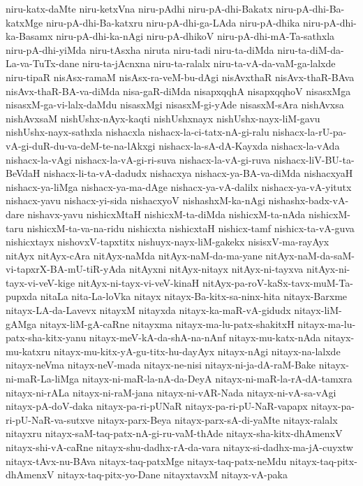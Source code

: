 {niru-katx-daMte
niru-ketxVna
niru-pAdhi
niru-pA-dhi-Bakatx
niru-pA-dhi-Ba-katxMge
niru-pA-dhi-Ba-katxru
niru-pA-dhi-ga-LAda
niru-pA-dhika
niru-pA-dhi-ka-Basamx
niru-pA-dhi-ka-nAgi
niru-pA-dhikoV
niru-pA-dhi-mA-Ta-sathxla
niru-pA-dhi-yiMda
niru-tAsxha
niruta
niru-tadi
niru-ta-diMda
niru-ta-diM-da-La-va-TuTx-dane
niru-ta-jAcnxna
niru-ta-ralalx
niru-ta-vA-da-vaM-ga-lalxde
niru-tipaR
nisAsx-ramaM
nisAsx-ra-veM-bu-dAgi
nisAvxthaR
nisAvx-thaR-BAva
nisAvx-thaR-BA-va-diMda
nisa-gaR-diMda
nisapxqqhA
nisapxqqhoV
nisasxMga
nisasxM-ga-vi-lalx-daMdu
nisasxMgi
nisasxM-gi-yAde
nisasxM-sAra
nishAvxsa
nishAvxsaM
nishUshx-nAyx-kaqti
nishUshxnayx
nishUshx-nayx-liM-gavu
nishUshx-nayx-sathxla
nishacxla
nishacx-la-ci-tatx-nA-gi-ralu
nishacx-la-rU-pa-vA-gi-duR-du-va-deM-te-na-lAkxgi
nishacx-la-sA-dA-Kayxda
nishacx-la-vAda
nishacx-la-vAgi
nishacx-la-vA-gi-ri-suva
nishacx-la-vA-gi-ruva
nishacx-liV-BU-ta-BeVdaH
nishacx-li-ta-vA-dadudx
nishacxya
nishacx-ya-BA-va-diMda
nishacxyaH
nishacx-ya-liMga
nishacx-ya-ma-dAge
nishacx-ya-vA-dalilx
nishacx-ya-vA-yitutx
nishacx-yavu
nishacx-yi-sida
nishacxyoV
nishashxM-ka-nAgi
nishashx-badx-vA-dare
nishavx-yavu
nishicxMtaH
nishicxM-ta-diMda
nishicxM-ta-nAda
nishicxM-taru
nishicxM-ta-va-na-ridu
nishicxta
nishicxtaH
nishicx-tamf
nishicx-ta-vA-guva
nishicxtayx
nishovxV-tapxtitx
nishuyx-nayx-liM-gakekx
nisisxV-ma-rayAyx
nitAyx
nitAyx-cAra
nitAyx-naMda
nitAyx-naM-da-ma-yane
nitAyx-naM-da-saM-vi-tapxrX-BA-mU-tiR-yAda
nitAyxni
nitAyx-nitayx
nitAyx-ni-tayxva
nitAyx-ni-tayx-vi-veV-kige
nitAyx-ni-tayx-vi-veV-kinaH
nitAyx-pa-roV-kaSx-tavx-muM-Ta-pupxda
nitaLa
nita-La-loVka
nitayx
nitayx-Ba-kitx-sa-ninx-hita
nitayx-Barxme
nitayx-LA-da-Lavevx
nitayxM
nitayxda
nitayx-ka-maR-vA-gidudx
nitayx-liM-gAMga
nitayx-liM-gA-caRne
nitayxma
nitayx-ma-lu-patx-shakitxH
nitayx-ma-lu-patx-sha-kitx-yanu
nitayx-meV-kA-da-shA-na-nAnf
nitayx-mu-katx-nAda
nitayx-mu-katxru
nitayx-mu-kitx-yA-gu-titx-hu-dayAyx
nitayx-nAgi
nitayx-na-lalxde
nitayx-neVma
nitayx-neV-mada
nitayx-ne-nisi
nitayx-ni-ja-dA-raM-Bake
nitayx-ni-maR-La-liMga
nitayx-ni-maR-la-nA-da-DeyA
nitayx-ni-maR-la-rA-dA-tamxra
nitayx-ni-rALa
nitayx-ni-raM-jana
nitayx-ni-vAR-Nada
nitayx-ni-vA-sa-vAgi
nitayx-pA-doV-daka
nitayx-pa-ri-pUNaR
nitayx-pa-ri-pU-NaR-vapapx
nitayx-pa-ri-pU-NaR-va-sutxve
nitayx-parx-Beya
nitayx-parx-sA-di-yaMte
nitayx-ralalx
nitayxru
nitayx-saM-taq-patx-nA-gi-ru-vaM-thAde
nitayx-sha-kitx-dhAmenxV
nitayx-shi-vA-caRne
nitayx-shu-dadhx-rA-da-vara
nitayx-si-dadhx-ma-jA-cuyxtw
nitayx-tAvx-nu-BAva
nitayx-taq-patxMge
nitayx-taq-patx-neMdu
nitayx-taq-pitx-dhAmenxV
nitayx-taq-pitx-yo-Dane
nitayxtavxM
nitayx-vA-paka
}
